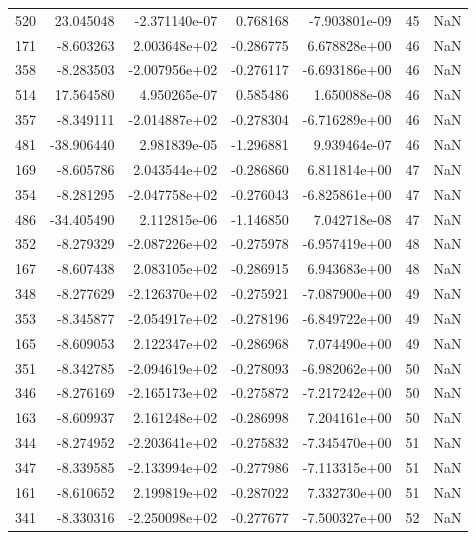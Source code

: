 \begin{tabular}{rrrrrrr}
 520 &  23.045048 & -2.371140e-07 &  0.768168 & -7.903801e-09 &          45 & NaN \\
 171 &  -8.603263 &  2.003648e+02 & -0.286775 &  6.678828e+00 &          46 & NaN \\
 358 &  -8.283503 & -2.007956e+02 & -0.276117 & -6.693186e+00 &          46 & NaN \\
 514 &  17.564580 &  4.950265e-07 &  0.585486 &  1.650088e-08 &          46 & NaN \\
 357 &  -8.349111 & -2.014887e+02 & -0.278304 & -6.716289e+00 &          46 & NaN \\
 481 & -38.906440 &  2.981839e-05 & -1.296881 &  9.939464e-07 &          46 & NaN \\
 169 &  -8.605786 &  2.043544e+02 & -0.286860 &  6.811814e+00 &          47 & NaN \\
 354 &  -8.281295 & -2.047758e+02 & -0.276043 & -6.825861e+00 &          47 & NaN \\
 486 & -34.405490 &  2.112815e-06 & -1.146850 &  7.042718e-08 &          47 & NaN \\
 352 &  -8.279329 & -2.087226e+02 & -0.275978 & -6.957419e+00 &          48 & NaN \\
 167 &  -8.607438 &  2.083105e+02 & -0.286915 &  6.943683e+00 &          48 & NaN \\
 348 &  -8.277629 & -2.126370e+02 & -0.275921 & -7.087900e+00 &          49 & NaN \\
 353 &  -8.345877 & -2.054917e+02 & -0.278196 & -6.849722e+00 &          49 & NaN \\
 165 &  -8.609053 &  2.122347e+02 & -0.286968 &  7.074490e+00 &          49 & NaN \\
 351 &  -8.342785 & -2.094619e+02 & -0.278093 & -6.982062e+00 &          50 & NaN \\
 346 &  -8.276169 & -2.165173e+02 & -0.275872 & -7.217242e+00 &          50 & NaN \\
 163 &  -8.609937 &  2.161248e+02 & -0.286998 &  7.204161e+00 &          50 & NaN \\
 344 &  -8.274952 & -2.203641e+02 & -0.275832 & -7.345470e+00 &          51 & NaN \\
 347 &  -8.339585 & -2.133994e+02 & -0.277986 & -7.113315e+00 &          51 & NaN \\
 161 &  -8.610652 &  2.199819e+02 & -0.287022 &  7.332730e+00 &          51 & NaN \\
 341 &  -8.330316 & -2.250098e+02 & -0.277677 & -7.500327e+00 &          52 & NaN \\

\end{tabular}
